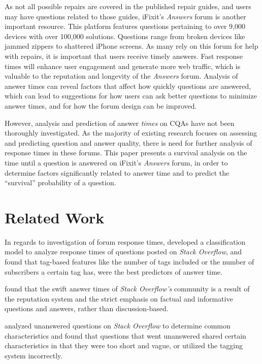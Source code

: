 \documentclass[12pt]{article}
\begin{document}
    As not all possible repairs are covered in the published repair guides, and users may have questions related to those guides, iFixit's \textit{Answers} forum is another important resource. This platform features questions pertaining to over 9,000 devices with over 100,000 solutions. Questions range from broken devices like jammed zippers to shattered iPhone screens. As many rely on this forum for help with repairs, it is important that users receive timely answers. Fast response times will enhance user engagement and generate more web traffic, which is valuable to the reputation and longevity of the \textit{Answers} forum. Analysis of answer times can reveal factors that affect how quickly questions are answered, which can lead to suggestions for how users can ask better questions to minimize answer times, and for how the forum design can be improved. 
    
    However, analysis and prediction of answer \textit{times} on CQAs have not been thoroughly investigated. As the majority of existing research focuses on assessing and predicting question and answer quality, there is need for further analysis of response times in these forums. This paper presents a survival analysis on the time until a question is answered on iFixit's \textit{Answers} forum, in order to determine factors significantly related to answer time and to predict the ``survival'' probability of a question.

\section{Related Work}

    In regards to investigation of forum response times, \citep{Bhat2014} developed a classification model to analyze response times of questions posted on \textit{Stack Overflow}, and found that tag-based features like the number of tags included or the number of subscribers a certain tag has, were the best predictors of answer time. 

    \citep{Mamykina2011} found that the swift answer times of \textit{Stack Overflow's} community is a result of the reputation system and the strict emphasis on factual and informative questions and answers, rather than discussion-based. 

    \citep{Asaduzzaman2013} analyzed unanswered questions on \textit{Stack Overflow} to determine common characteristics and found that questions that went unanswered shared certain characteristics in that they were too short and vague, or utilized the tagging system incorrectly. 
\end{document}
